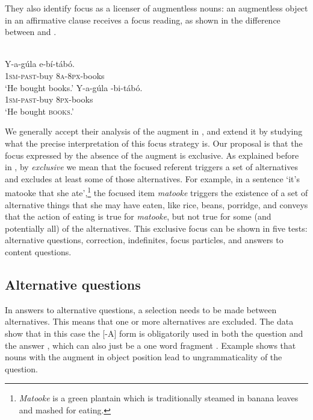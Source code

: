 \documentclass[output=paper]{langsci/langscibook}
\begin{document}
They also identify focus as a licenser of augmentless nouns: an augmentless object in an affirmative clause receives a focus reading, as shown in the difference between  and .

\ea\label{ex:vanderwal:25} \citet[228]{HymanKatamba1993}\\
\ea\label{ex:vanderwal:25a}
\gll    Y-a-gúla    e-bí-tábó.\\
       \textsc{1sm}-\textsc{past}-buy  \textsc{8a}-\textsc{8px}-books\\
\glt   ‘He bought books.'
\ex\label{ex:vanderwal:25b}
\gll   Y-a-gúla    {\longrule}-bi-tábó.\\
       \textsc{1sm}-\textsc{past}-buy       \textsc{8px}-books\\
\glt   ‘He bought \textsc{books}.’
\z
\z

We generally accept their analysis of the augment in , and extend it by studying what the precise interpretation of this focus strategy is. Our proposal is that the focus expressed by the absence of the augment is exclusive. As explained before in , by \textit{exclusive} we mean that the focused referent triggers a set of alternatives and excludes at least some of those alternatives. For example, in a sentence ‘it’s matooke that she ate’,\footnote{\textit{Matooke} is a green plantain which is traditionally steamed in banana leaves and mashed for eating. } {} the focused item \textit{matooke} triggers the existence of a set of alternative things that she may have eaten, like rice, beans, porridge, and conveys that the action of eating is true for \textit{matooke}, but not true for some (and potentially all) of the alternatives. This exclusive focus can be shown in five tests: alternative questions, correction, indefinites, focus particles, and answers to content questions.

\subsection{Alternative questions}\label{sec:vanderwal:4.1} %

In answers to alternative questions, a selection needs to be made between alternatives. This means that one or more alternatives are excluded. The data show that in this case the [-A] form is obligatorily used in both the question  and the answer , which can also just be a one word fragment . Example  shows that nouns with the augment in object position lead to ungrammaticality of the question. 
\end{document}

